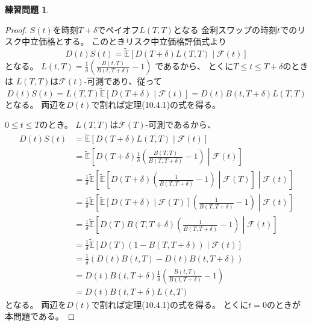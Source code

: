 \documentclass[uplatex]{jsarticle}
\theoremstyle{definition}
\newtheorem{prob}[prob]{練習問題}
\def\E{\mathbb{E}}
\def\mcF{\mathcal{F}}
\begin{document}
\begin{prob}\label{prob: 10.12}
\end{prob}

\begin{proof}
  \(S(t)\)を時刻\(T+\delta\)でペイオフ\(L(T,T)\)となる
  金利スワップの時刻\(t\)でのリスク中立価格とする。
  このときリスク中立価格評価式より
  \[
  D(t)S(t) = \tilde{\E}\left[ D(T+\delta)L(T,T) \middle| \mcF(t) \right]
  \]
  となる。
  \(L(t,T) = \frac{1}{\delta}\left( \frac{B(t,T)}{B(t,T+\delta)}-1\right)\)
  であるから、
  とくに\(T \leq t \leq T+\delta\)のときは
  \(L(T,T)\)は\(\mcF(t)\)-可測であり、従って
  \[
  D(t)S(t) = L(T,T)\tilde{\E}\left[ D(T+\delta) \middle| \mcF(t) \right]
  = D(t)B(t,T+\delta)L(T,T)
  \]
  となる。
  両辺を\(D(t)\)で割れば定理(10.4.1)の式を得る。

  \(0\leq t\leq T\)のとき。
  \(L(T,T)\)は\(\mcF(T)\)-可測であるから、
  \begin{align*}
    D(t)S(t)
    &= \tilde{\E}\left[ D(T+\delta)L(T,T) \middle| \mcF(t) \right] \\
    &= \tilde{\E}\left[ D(T+\delta)\frac{1}{\delta}
    \left( \frac{B(T,T)}{B(T,T+\delta)} - 1 \right) \middle|\mcF(t) \right] \\
    &= \frac{1}{\delta}\tilde{\E}\left[ \tilde{\E}\left[ D(T+\delta)
    \left( \frac{1}{B(T,T+\delta)} - 1 \right)
    \middle|\mcF(T) \right] \middle|\mcF(t) \right] \\
    &= \frac{1}{\delta}\tilde{\E}\left[
    \tilde{\E}\left[ D(T+\delta) \middle|\mcF(T) \right]
    \left( \frac{1}{B(T,T+\delta)} - 1 \right) \middle|\mcF(t) \right] \\
    &= \frac{1}{\delta} \tilde{\E}\left[ D(T)B(T,T+\delta)
    \left( \frac{1}{B(T,T+\delta)} - 1 \right) \middle|\mcF(t) \right] \\
    &= \frac{1}{\delta} \tilde{\E}\left[ D(T)(1-B(T,T+\delta))
    \middle|\mcF(t) \right] \\
    &= \frac{1}{\delta} \left( D(t)B(t,T)-D(t)B(t,T+\delta) \right) \\
    &= D(t)B(t,T+\delta)\frac{1}{\delta}
    \left( \frac{B(t,T)}{B(t,T+\delta)}-1 \right) \\
    &= D(t)B(t,T+\delta)L(t,T)
  \end{align*}
  となる。
  両辺を\(D(t)\)で割れば定理(10.4.1)の式を得る。
  とくに\(t=0\)のときが本問題である。
\end{proof}
\end{document}
